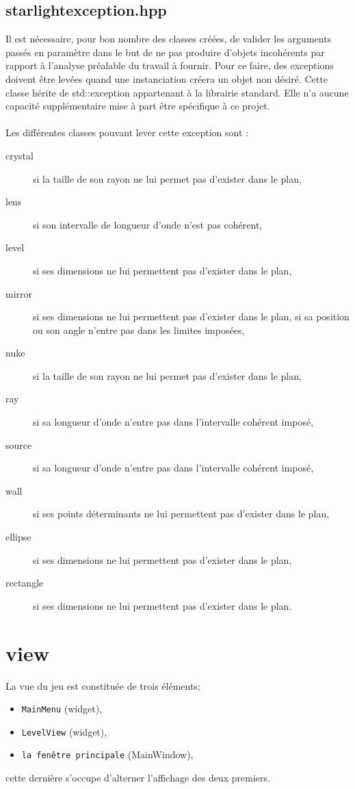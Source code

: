 \documentclass[a4paper,11pt]{report}
\begin{document}
\subsection[Exception Starlight]{starlightexception.hpp}
Il est nécessaire, pour bon nombre des classes créées, de valider les arguments passés en
paramètre dans le but de ne pas produire d'objets incohérents par rapport à
l'analyse préalable du travail à fournir. Pour ce faire, des exceptions doivent
être levées quand une instanciation créera un objet non désiré. 
Cette classe hérite de std::exception appartenant à la librairie standard. Elle n'a aucune
capacité supplémentaire mise à part être spécifique à ce projet. \\ \\

Les différentes classes pouvant lever cette exception sont :
\begin{description}
	\item[crystal] si la taille de son rayon ne lui permet pas d'exister dans le
		plan,
	\item[lens] si son intervalle de longueur d'onde n'est pas cohérent,
	\item[level] si ses dimensions ne lui permettent pas d'exister dans le plan,
	\item[mirror] si ses dimensions ne lui permettent pas d'exister dans le
		plan, si sa position ou son angle n'entre pas dans les limites imposées,
	\item[nuke] si la taille de son rayon ne lui permet pas d'exister dans le
		plan,
	\item[ray] si sa longueur d'onde n'entre pas dans l'intervalle cohérent
		imposé,
	\item[source] si sa longueur d'onde n'entre pas dans l'intervalle cohérent
		imposé,
	\item[wall] si ses points déterminants ne lui permettent pas d'exister dans
		le plan,
	\item[ellipse] si ses dimensions ne lui permettent pas d'exister dans le
		plan,
	\item[rectangle] si ses dimensions ne lui permettent pas d'exister dans le
		plan.
\end{description}
\section[Les objets visuels]{view}
La vue du jeu est constituée de trois éléments;
\begin{itemize}
	\item \texttt{MainMenu} (widget),
	\item \texttt{LevelView} (widget),
	\item \texttt{la fenêtre principale} (MainWindow),
\end{itemize}
cette dernière s'occupe d'alterner l'affichage des deux premiers.
\end{document}
